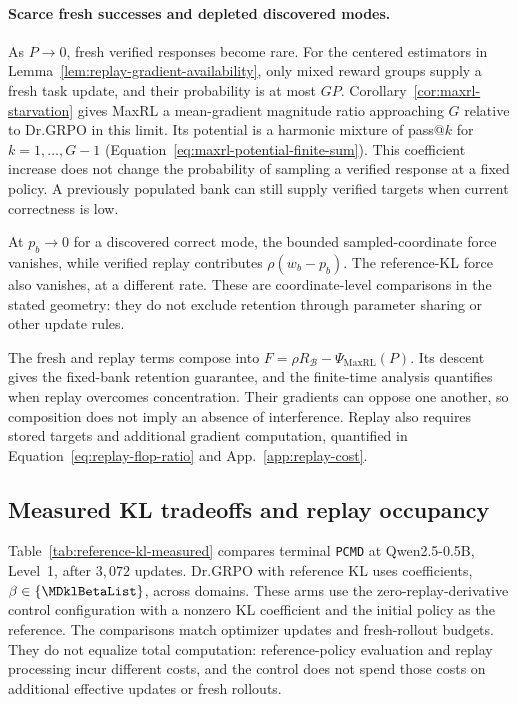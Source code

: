\documentclass{article}
\newcommand{\1}{\mathbf 1}
\newcommand{\pmd}{\texttt{PCMD}}
\theoremstyle{remark}
\theoremstyle{definition}
\theoremstyle{plain}
\begin{document}
\paragraph{Scarce fresh successes and depleted discovered modes.}
As $P\to0$, fresh verified responses become rare. For the centered
estimators in Lemma~\ref{lem:replay-gradient-availability}, only mixed
reward groups supply a fresh task update, and their probability is at most
$GP$. Corollary~\ref{cor:maxrl-starvation} gives MaxRL a mean-gradient
magnitude ratio approaching $G$ relative to Dr.GRPO in this limit.
Its potential is a harmonic mixture of pass@$k$ for $k=1,\ldots,G-1$
(Equation~\eqref{eq:maxrl-potential-finite-sum}). This coefficient increase
does not change the probability of sampling a verified response at a fixed
policy. A previously populated bank can still supply verified targets when
current correctness is low.

At $p_b\to0$ for a discovered correct mode, the bounded sampled-coordinate
force vanishes, while verified replay contributes $\rho(w_b-p_b)$.
The reference-KL force also vanishes, at a different rate.
These are coordinate-level comparisons in the stated geometry: they do not
exclude retention through parameter sharing or other update rules.

The fresh and replay terms compose into
$F=\rho R_{\mathcal B}-\Psi_{\mathrm{MaxRL}}(P)$.
Its descent gives the fixed-bank retention guarantee, and the finite-time
analysis quantifies when replay overcomes concentration. Their gradients can
oppose one another, so composition does not imply an absence of interference.
Replay also requires stored targets and additional gradient computation,
quantified in Equation~\eqref{eq:replay-flop-ratio} and
App.~\ref{app:replay-cost}.

\subsection{Measured KL tradeoffs and replay occupancy}
\label{app:theory-kl-measured}

Table~\ref{tab:reference-kl-measured} compares terminal \pmd{} at
Qwen2.5-0.5B, Level~1, after $3{,}072$ updates. Dr.GRPO with reference KL
uses \MDklBetaCount{} coefficients, $\beta\in\{\MDklBetaList\}$, across
\MDklDomains{} domains. These arms use the zero-replay-derivative control
configuration with a nonzero KL coefficient and the initial policy as the
reference. The comparisons match optimizer updates and fresh-rollout
budgets. They do not equalize total computation: reference-policy evaluation
and replay processing incur different costs, and the control does not spend
those costs on additional effective updates or fresh rollouts.
\end{document}
